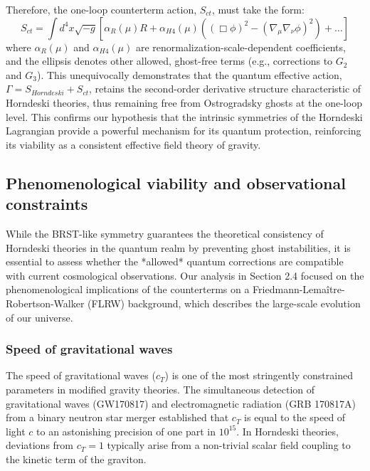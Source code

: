 \documentclass[twocolumn]{aastex631}
\begin{document}
Therefore, the one-loop counterterm action, $S_{ct}$, must take the form:
\begin{equation}
S_{ct} = \int d^4x \sqrt{-g} \left[ \alpha_R(\mu) R + \alpha_{H4}(\mu) \left( (\Box\phi)^2 - (\nabla_\mu\nabla_\nu\phi)^2 \right) + \dots \right]
\label{eq:counterterm_action}
\end{equation}
where $\alpha_R(\mu)$ and $\alpha_{H4}(\mu)$ are renormalization-scale-dependent coefficients, and the ellipsis denotes other allowed, ghost-free terms (e.g., corrections to $G_2$ and $G_3$). This unequivocally demonstrates that the quantum effective action, $\Gamma = S_{Horndeski} + S_{ct}$, retains the second-order derivative structure characteristic of Horndeski theories, thus remaining free from Ostrogradsky ghosts at the one-loop level. This confirms our hypothesis that the intrinsic symmetries of the Horndeski Lagrangian provide a powerful mechanism for its quantum protection, reinforcing its viability as a consistent effective field theory of gravity.

\subsection{Phenomenological viability and observational constraints}
While the BRST-like symmetry guarantees the theoretical consistency of Horndeski theories in the quantum realm by preventing ghost instabilities, it is essential to assess whether the *allowed* quantum corrections are compatible with current cosmological observations. Our analysis in Section 2.4 focused on the phenomenological implications of the counterterms on a Friedmann-Lemaître-Robertson-Walker (FLRW) background, which describes the large-scale evolution of our universe.

\subsubsection{Speed of gravitational waves}
The speed of gravitational waves ($c_T$) is one of the most stringently constrained parameters in modified gravity theories. The simultaneous detection of gravitational waves (GW170817) and electromagnetic radiation (GRB 170817A) from a binary neutron star merger established that $c_T$ is equal to the speed of light $c$ to an astonishing precision of one part in $10^{15}$. In Horndeski theories, deviations from $c_T=1$ typically arise from a non-trivial scalar field coupling to the kinetic term of the graviton.
\end{document}
